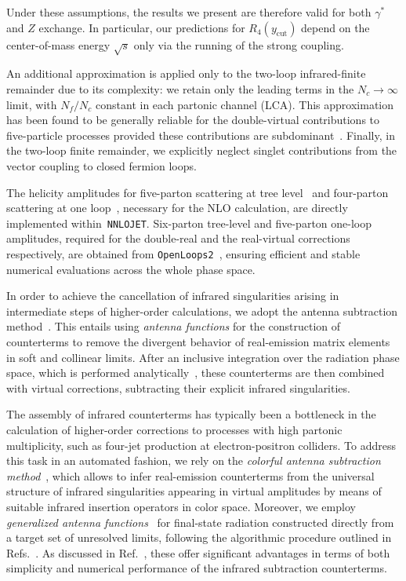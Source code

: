 \documentclass[10pt,aps,prl,superscriptaddress,twocolumn,preprintnumbers,nofootinbib]{revtex4-2}
\newcommand{\ycut}{y_{\mathrm{cut}}}
\begin{document}
Under these assumptions, the results we present are therefore valid for both $\gamma^*$ and $Z$ exchange. In particular, our predictions for $R_4(\ycut)$ depend on the center-of-mass energy $\sqrt{s}$ only via the running of the strong coupling.



An additional approximation is applied only to the two-loop infrared-finite remainder due to its complexity: we retain only the leading terms in the $N_c \to \infty$ limit, with $N_f/N_c$ constant in each partonic channel (LCA). This approximation has been found to be generally reliable for the double-virtual contributions to five-particle processes provided these contributions are subdominant~\cite{Badger:2023mgf,Abreu:2023bdp,Buccioni:2025bkl,Czakon:2025wgs}. Finally, in the two-loop finite remainder, we explicitly neglect singlet contributions from the vector coupling to closed fermion loops.


The helicity amplitudes for five-parton scattering at tree level~\cite{Hagiwara:1988pp, Berends:1988yn, Falck:1988gc} and four-parton scattering at one loop~\cite{Glover:1996eh,Campbell:1997tv,Bern:1997sc}, necessary for the NLO calculation, are directly implemented within~\texttt{NNLOJET}.
Six-parton tree-level and five-parton one-loop amplitudes, required for the double-real and the real-virtual corrections respectively, are obtained from \texttt{OpenLoops2}~\cite{Buccioni:2019sur,Buccioni:2017yxi}, ensuring efficient and stable numerical evaluations across the whole phase space.

In order to achieve the cancellation of infrared singularities arising in intermediate steps of higher-order calculations, we adopt the antenna subtraction method~\cite{Gehrmann-DeRidder:2005btv,Currie:2013vh}. This entails using \textit{antenna functions} for the construction of counterterms to remove the divergent behavior of real-emission matrix elements in soft and collinear limits. After an inclusive integration over the radiation phase space, which is performed analytically~\cite{Gehrmann-DeRidder:2003pne}, these counterterms are then combined with virtual corrections, subtracting their explicit infrared singularities.

The assembly of infrared counterterms has typically been a bottleneck in the calculation of higher-order corrections to processes with high partonic multiplicity, such as four-jet production at electron-positron colliders. To address this task in an automated fashion, we rely on the \textit{colorful antenna subtraction method}~\cite{Chen:2022ktf,Gehrmann:2023dxm}, which allows to infer real-emission counterterms from the universal structure of infrared singularities appearing in virtual amplitudes by means of suitable infrared insertion operators in color space. Moreover, we employ \textit{generalized antenna functions}~\cite{Fox:2024bfp} for final-state radiation constructed directly from a target set of unresolved limits, following the algorithmic procedure outlined in Refs.~\cite{Braun-White:2023sgd,Braun-White:2023zwd}. As discussed in Ref.~\cite{Fox:2024bfp}, these offer significant advantages in terms of both simplicity and numerical performance of the infrared subtraction counterterms.
\end{document}
